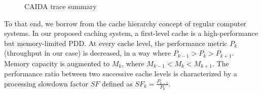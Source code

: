 \begin{figure}[]
	\begin{adjustwidth}{-0.80cm}{}
		\centering
		\caption{CAIDA trace summary}
		\label{fig:traces}
	\end{adjustwidth}
\end{figure}


To that end, we borrow from the cache hierarchy concept of regular computer systems.
In our proposed caching system, a first-level cache is a high-performance but memory-limited PDD.
At every cache level, the performance metric $P_{k}$ (throughput in our case) is decreased, in a way where $P_{k-1} > P_{k} > P_{k+1}$.
Memory capacity is augmented to $M_{k}$, where $M_{k-1} < M_{k} < M_{k+1}$. 
The performance ratio between two successive cache levels is characterized by a processing slowdown factor $SF$ defined as $SF_{k} = \frac{P_{k-1}}{P_{k}}$.


